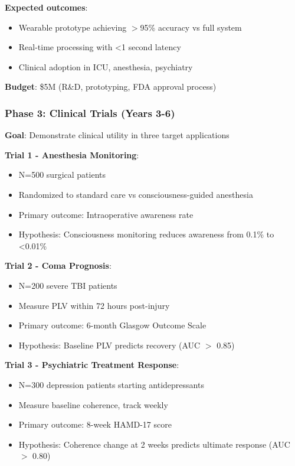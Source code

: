 \documentclass[11pt,onecolumn]{article}
\begin{document}
\textbf{Expected outcomes}:
\begin{itemize}
\item Wearable prototype achieving $>$95\% accuracy vs full system
\item Real-time processing with <1 second latency
\item Clinical adoption in ICU, anesthesia, psychiatry
\end{itemize}

\textbf{Budget}: \$5M (R\&D, prototyping, FDA approval process)

\subsubsection{Phase 3: Clinical Trials (Years 3-6)}

\textbf{Goal}: Demonstrate clinical utility in three target applications

\textbf{Trial 1 - Anesthesia Monitoring}:

\begin{itemize}
\item N=500 surgical patients
\item Randomized to standard care vs consciousness-guided anesthesia
\item Primary outcome: Intraoperative awareness rate
\item Hypothesis: Consciousness monitoring reduces awareness from 0.1\% to <0.01\%
\end{itemize}

\textbf{Trial 2 - Coma Prognosis}:

\begin{itemize}
\item N=200 severe TBI patients
\item Measure PLV within 72 hours post-injury
\item Primary outcome: 6-month Glasgow Outcome Scale
\item Hypothesis: Baseline PLV predicts recovery (AUC $>$ 0.85)
\end{itemize}

\textbf{Trial 3 - Psychiatric Treatment Response}:

\begin{itemize}
\item N=300 depression patients starting antidepressants
\item Measure baseline coherence, track weekly
\item Primary outcome: 8-week HAMD-17 score
\item Hypothesis: Coherence change at 2 weeks predicts ultimate response (AUC $>$ 0.80)
\end{itemize}
\end{document}
